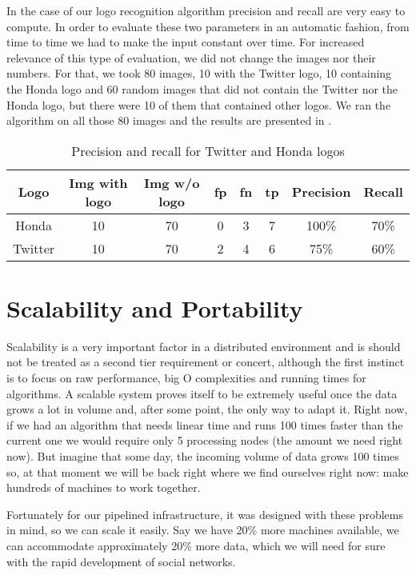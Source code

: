 In the case of our logo recognition algorithm precision and recall are very
easy to compute. In order to evaluate these two parameters in an automatic
fashion, from time to time we had to make the input constant over time. For
increased relevance of this type of evaluation, we did not change the images
nor their numbers. For that, we took 80 images, 10 with the Twitter logo, 10
containing the Honda logo and 60 random images that did not contain the
Twitter nor the Honda logo, but there were 10 of them that contained other
logos. We ran the algorithm on all those 80 images and the results are
presented in .

\begin{center}
\begin{table}[htb]
\centering
  \caption{Precision and recall for Twitter and Honda logos}
  \begin{tabular}{|c|c|c|c|c|c|c|c|}
    Logo & Img with logo & Img w/o logo & fp &
    fn & tp & Precision & Recall \\
    \hline
    Honda & 10 & 70 & 0 & 3 & 7 & 100\% & 70\% \\
    \hline
    Twitter & 10 & 70 & 2 & 4 & 6 & 75\% & 60\% \\
    \hline
  \end{tabular}
  \label{table:prec-rec}
\end{table}
\end{center}

\section{Scalability and Portability}

Scalability is a very important factor in a distributed environment and
is should not be treated as a second tier requirement or concert, although the
first instinct is to focus on raw performance, big O complexities and running
times for algorithms. A scalable system proves itself to be extremely useful
once the data grows a lot in volume and, after some point, the only way to
adapt it. Right now, if we had an algorithm that needs linear time and runs
100 times faster than the current one we would require only 5 processing nodes
(the amount we need right now). But imagine that some day, the incoming volume
of data grows 100 times so, at that moment we will be back right where we find
ourselves right now: make hundreds of machines to work together.

Fortunately for our pipelined infrastructure, it was designed with these
problems in mind, so we can scale it easily. Say we have 20\% more machines
available, we can accommodate approximately 20\% more data, which we will need
for sure with the rapid development of social networks.

